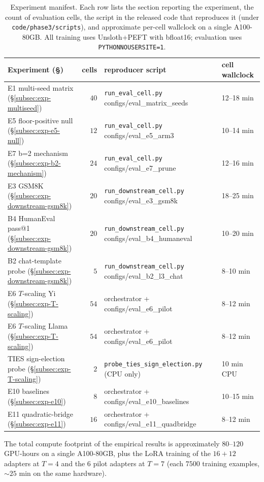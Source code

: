 \begin{table}[h]
\centering
\caption{Experiment manifest. Each row lists the section reporting
the experiment, the count of evaluation cells, the script in the
released code that reproduces it (under \texttt{code/phase3/scripts}),
and approximate per-cell wallclock on a single A100-80GB. All
training uses Unsloth+PEFT with bfloat16; evaluation uses
\texttt{PYTHONNOUSERSITE=1}.}
\label{tab:repro-manifest}
\small
\begin{tabular}{lrll}
\hline
Experiment (\S) & cells & reproducer script & cell wallclock \\
\hline
E1 multi-seed matrix (\S\ref{subsec:exp-multiseed})       & $40$ & \texttt{run\_eval\_cell.py} configs/eval\_matrix\_seeds & 12--18 min \\
E5 floor-positive null (\S\ref{subsec:exp-e5-null})      & $12$ & \texttt{run\_eval\_cell.py} configs/eval\_e5\_arm3       & 10--14 min \\
E7 b=2 mechanism (\S\ref{subsec:exp-b2-mechanism})       & $24$ & \texttt{run\_eval\_cell.py} configs/eval\_e7\_prune      & 12--16 min \\
E3 GSM8K (\S\ref{subsec:exp-downstream-gsm8k})           & $20$ & \texttt{run\_downstream\_cell.py} configs/eval\_e3\_gsm8k & 18--25 min \\
B4 HumanEval pass@1 (\S\ref{subsec:exp-downstream-gsm8k})& $20$ & \texttt{run\_downstream\_cell.py} configs/eval\_b4\_humaneval & 10--20 min \\
B2 chat-template probe (\S\ref{subsec:exp-downstream-gsm8k}) & $5$ & \texttt{run\_downstream\_cell.py} configs/eval\_b2\_l3\_chat & 8--10 min \\
E6 $T$-scaling Yi (\S\ref{subsec:exp-T-scaling})        & $54$ & orchestrator + configs/eval\_e6\_pilot                 & 8--12 min \\
E6 $T$-scaling Llama (\S\ref{subsec:exp-T-scaling})     & $54$ & orchestrator + configs/eval\_e6\_pilot                 & 8--12 min \\
TIES sign-election probe (\S\ref{subsec:exp-T-scaling}) & $2$ & \texttt{probe\_ties\_sign\_election.py} (CPU only)        & 10 min CPU \\
E10 baselines (\S\ref{subsec:exp-e10})                  & $8$ & orchestrator + configs/eval\_e10\_baselines           & 10--15 min \\
E11 quadratic-bridge (\S\ref{subsec:exp-e11})           & $16$ & orchestrator + configs/eval\_e11\_quadbridge          & 8--12 min \\
\hline
\end{tabular}
\end{table}

The total compute footprint of the empirical results is
approximately $80$--$120$ GPU-hours on a single A100-80GB, plus the
LoRA training of the $16+12$ adapters at $T = 4$ and the $6$ pilot
adapters at $T = 7$ (each $7500$ training examples, $\sim 25$ min on
the same hardware).
